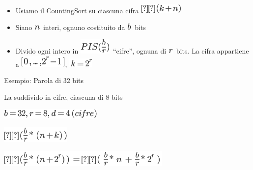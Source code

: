 \documentclass{article}
\providecommand{\tightlist}{%
  \setlength{\itemsep}{0pt}\setlength{\parskip}{0pt}}
\begin{document}
\begin{itemize}
\tightlist
\item
  {Usiamo il CountingSort su ciascuna cifra
  }\includegraphics{images/image198.png}
\item
  {Siano }\includegraphics{images/image41.png}{~interi, ognuno
  costituito da }\includegraphics{images/image200.png}{~bits}
\item
  {Divido ogni intero in
  }\includegraphics{images/image201.png}{~``cifre'', ognuna di
  }\includegraphics{images/image83.png}{~bits. La cifra appartiene a
  }\includegraphics{images/image202.png}{,
  }\includegraphics{images/image203.png}
\end{itemize}

{}

{Esempio: Parola di 32 bits}

{La suddivido in cifre, ciascuna di 8 bits}

\includegraphics{images/image204.png}

\includegraphics{images/image205.png}

\includegraphics{images/image206.png}
\end{document}
